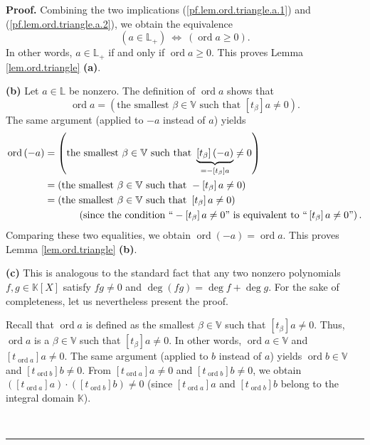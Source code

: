\documentclass[numbers=enddot,12pt,final,onecolumn,notitlepage]{scrartcl}%
\theoremstyle{definition}
\newenvironment{proof}[1][Proof]{\noindent\textbf{#1.} }{\ \rule{0.5em}{0.5em}}
\renewcommand{\geq}{\geqslant}
\theoremstyle{plainsl}
\begin{document}
\begin{proof}
Combining the two implications (\ref{pf.lem.ord.triangle.a.1}) and
(\ref{pf.lem.ord.triangle.a.2}), we obtain the equivalence
\[
\left(  a\in\mathbb{L}_{+}\right)  \ \Longleftrightarrow\ \left(
\operatorname*{ord}a\geq0\right)  .
\]
In other words, $a\in\mathbb{L}_{+}$ if and only if $\operatorname*{ord}%
a\geq0$. This proves Lemma \ref{lem.ord.triangle} \textbf{(a)}. \medskip

\textbf{(b)} Let $a\in\mathbb{L}$ be nonzero. The definition of
$\operatorname*{ord}a$ shows that
\[
\operatorname*{ord}a=\left(  \text{the smallest }\beta\in\mathbb{V}\text{ such
that }\left[  t_{\beta}\right]  a\neq0\right)  .
\]
The same argument (applied to $-a$ instead of $a$) yields%
\begin{align*}
\operatorname*{ord}\left(  -a\right)   &  =\left(  \text{the smallest }%
\beta\in\mathbb{V}\text{ such that }\underbrace{\left[  t_{\beta}\right]
\left(  -a\right)  }_{=-\left[  t_{\beta}\right]  a}\neq0\right) \\
&  =\left(  \text{the smallest }\beta\in\mathbb{V}\text{ such that }-\left[
t_{\beta}\right]  a\neq0\right) \\
&  =\left(  \text{the smallest }\beta\in\mathbb{V}\text{ such that }\left[
t_{\beta}\right]  a\neq0\right) \\
&  \ \ \ \ \ \ \ \ \ \ \left(  \text{since the condition \textquotedblleft%
}-\left[  t_{\beta}\right]  a\neq0\text{\textquotedblright\ is equivalent to
\textquotedblleft}\left[  t_{\beta}\right]  a\neq0\text{\textquotedblright%
}\right)  .
\end{align*}
Comparing these two equalities, we obtain $\operatorname*{ord}\left(
-a\right)  =\operatorname*{ord}a$. This proves Lemma \ref{lem.ord.triangle}
\textbf{(b)}. \medskip

\textbf{(c)} This is analogous to the standard fact that any two nonzero
polynomials $f,g\in\mathbb{K}\left[  X\right]  $ satisfy $fg\neq0$ and
$\deg\left(  fg\right)  =\deg f+\deg g$. For the sake of completeness, let us
nevertheless present the proof.

Recall that $\operatorname*{ord}a$ is defined as the smallest $\beta
\in\mathbb{V}$ such that $\left[  t_{\beta}\right]  a\neq0$. Thus,
$\operatorname*{ord}a$ is a $\beta\in\mathbb{V}$ such that $\left[  t_{\beta
}\right]  a\neq0$. In other words, $\operatorname*{ord}a\in\mathbb{V}$ and
$\left[  t_{\operatorname*{ord}a}\right]  a\neq0$. The same argument (applied
to $b$ instead of $a$) yields $\operatorname*{ord}b\in\mathbb{V}$ and $\left[
t_{\operatorname*{ord}b}\right]  b\neq0$. From $\left[  t_{\operatorname*{ord}%
a}\right]  a\neq0$ and $\left[  t_{\operatorname*{ord}b}\right]  b\neq0$, we
obtain $\left(  \left[  t_{\operatorname*{ord}a}\right]  a\right)
\cdot\left(  \left[  t_{\operatorname*{ord}b}\right]  b\right)  \neq0$ (since
$\left[  t_{\operatorname*{ord}a}\right]  a$ and $\left[
t_{\operatorname*{ord}b}\right]  b$ belong to the integral domain $\mathbb{K}$).


\end{proof}
\end{document}
